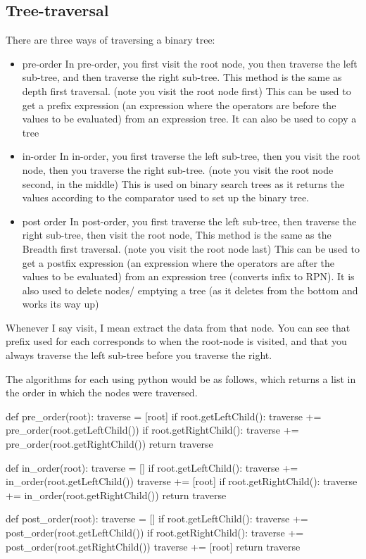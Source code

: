 \subsection{Tree-traversal}
  \noindent
  There are three ways of traversing a binary tree:
  \begin{itemize}
  	\item pre-order
	  	\subitem In pre-order, you first visit the root node, you then traverse the left sub-tree, and then traverse the right sub-tree. This method is the same as depth first traversal. (note you visit the root node first)
	  	\subitem This can be used to get a prefix expression (an expression where the operators are before the values to be evaluated) from an expression tree. It can also be used to copy a tree
  	\item in-order
	  	\subitem In in-order, you first traverse the left sub-tree, then you visit the root node, then you traverse the right sub-tree. (note you visit the root node second, in the middle)
	  	\subitem This is used on binary search trees as it returns the values according to the comparator used to set up the binary tree.
  	\item post order
	  	\subitem In post-order, you first traverse the left sub-tree, then traverse the right sub-tree, then visit the root node, This method is the same as the Breadth first traversal. (note you visit the root node last)
	  	\subitem This can be used to get a postfix expression (an expression where the operators are after the values to be evaluated) from an expression tree (converts infix to RPN). It is also used to delete nodes/ emptying a tree (as it deletes from the bottom and works its way up)  
  \end{itemize}
  Whenever I say visit, I mean extract the data from that node. You can see that prefix used for each corresponds to when the root-node is visited, and that you always traverse the left sub-tree before you traverse the right.
  
  The algorithms for each using python would be as follows, which returns a list in the order in which the nodes were traversed.
  
  \begin{python}
def pre_order(root):
	traverse = [root]
	if root.getLeftChild():
		traverse += pre_order(root.getLeftChild())
	if root.getRightChild():
		traverse += pre_order(root.getRightChild())
	return traverse

def in_order(root):
	traverse = []
	if root.getLeftChild():
		traverse += in_order(root.getLeftChild())
	traverse += [root]
	if root.getRightChild():
		traverse += in_order(root.getRightChild())
	return traverse

def post_order(root):
	traverse = []
	if root.getLeftChild():
		traverse += post_order(root.getLeftChild())
	if root.getRightChild():
		traverse += post_order(root.getRightChild())
	traverse += [root]
	return traverse
\end{python}
